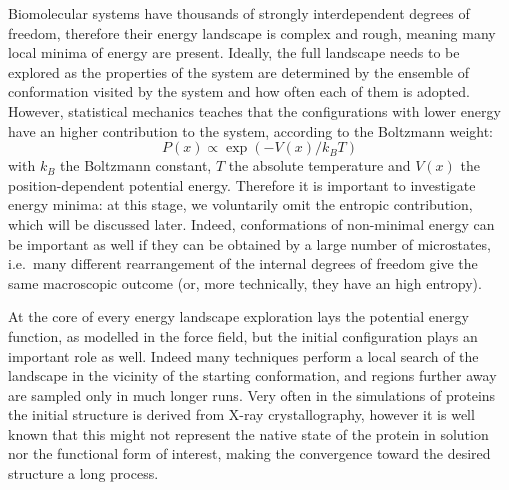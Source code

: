 Biomolecular systems have thousands of strongly interdependent degrees of freedom, therefore their energy landscape is complex and rough, meaning many local minima of energy are present. Ideally, the full landscape needs to be explored as the properties of the system are determined by the ensemble of conformation visited by the system and how often each of them is adopted. However, statistical mechanics teaches that the configurations with lower energy have an higher contribution to the system, according to the Boltzmann weight:
\begin{equation}
P(x) \propto \exp(-V(x)/k_BT)
\end{equation}
with $k_B$ the Boltzmann constant, $T$ the absolute temperature and $V(x)$ the position-dependent potential energy. Therefore it is important to investigate energy minima:
%
at this stage, we voluntarily omit the entropic contribution, which will be discussed later. Indeed, conformations of non-minimal energy can be important as well if they can be obtained by a large number of microstates, i.e.\ many different rearrangement of the internal degrees of freedom give the same macroscopic outcome (or, more technically, they have an high entropy).

At the core of every energy landscape exploration lays the potential energy function, as modelled in the force field, but the initial configuration plays an important role as well.
%
Indeed many techniques perform a local search of the landscape in the vicinity of the starting conformation, and regions further away are sampled only in much longer runs. Very often in the simulations of proteins the initial structure is derived from X-ray crystallography, however it is well known that this might not represent the native state of the protein in solution nor the functional form of interest, making the convergence toward the desired structure a long process.

